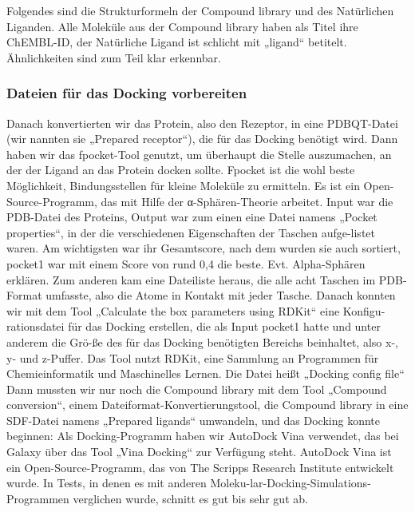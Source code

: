 \documentclass[11pt]{article}
\begin{document}
{    %

        Folgendes sind die Strukturformeln der Compound library und des Natürlichen Liganden. Alle Moleküle aus der Compound library haben als Titel ihre ChEMBL-ID, der Natürliche Ligand ist schlicht mit „ligand“ betitelt. Ähnlichkeiten sind zum Teil klar erkennbar.

    \subsubsection{Dateien für das Docking vorbereiten}\label{subsec:dateien-für-das-docking-vorbereiten}

    Danach konvertierten wir das Protein, also den Rezeptor, in eine PDBQT-Datei (wir nannten sie „Prepared receptor“), die für das Docking benötigt wird.
    Dann haben wir das fpocket-Tool genutzt, um überhaupt die Stelle auszumachen, an der der Ligand an das Protein docken sollte. Fpocket ist die wohl beste Möglichkeit, Bindungsstellen für kleine Moleküle zu ermitteln. Es ist ein Open-Source-Programm, das mit Hilfe der α-Sphären-Theorie arbeitet. Input war die PDB-Datei des Proteins, Output war zum einen eine Datei namens „Pocket properties“, in der die verschiedenen Eigenschaften der Taschen aufge-listet waren. Am wichtigsten war ihr Gesamtscore, nach dem wurden sie auch sortiert, pocket1 war mit einem Score von rund 0,4 die beste.
    Evt. Alpha-Sphären erklären.
    Zum anderen kam eine Dateiliste heraus, die alle acht Taschen im PDB-Format umfasste, also die Atome in Kontakt mit jeder Tasche.
    Danach konnten wir mit dem Tool „Calculate the box parameters using RDKit“ eine Konfigu-rationsdatei für das Docking erstellen, die als Input pocket1 hatte und unter anderem die Grö-ße des für das Docking benötigten Bereichs beinhaltet, also x-, y- und z-Puffer. Das Tool nutzt RDKit, eine Sammlung an Programmen für Chemieinformatik und Maschinelles Lernen. Die Datei heißt „Docking config file“
    Dann mussten wir nur noch die Compound library mit dem Tool „Compound conversion“, einem Dateiformat-Konvertierungstool, die Compound library in eine SDF-Datei namens „Prepared ligands“ umwandeln, und das Docking konnte beginnen:
    Als Docking-Programm haben wir AutoDock Vina verwendet, das bei Galaxy über das Tool „Vina Docking“ zur Verfügung steht. AutoDock Vina ist ein Open-Source-Programm, das von The Scripps Research Institute entwickelt wurde. In Tests, in denen es mit anderen Moleku-lar-Docking-Simulations-Programmen verglichen wurde, schnitt es gut bis sehr gut ab.

}
\end{document}
